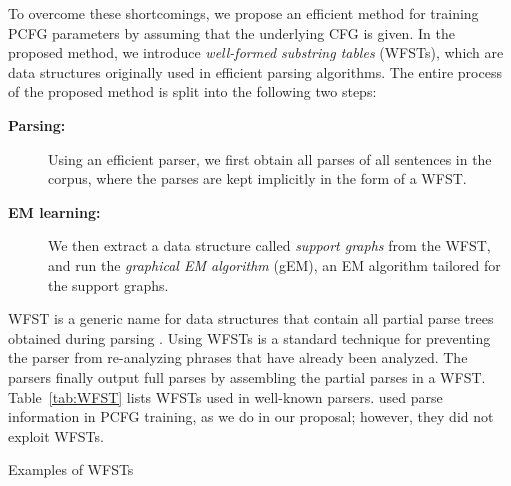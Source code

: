 \documentclass[english]{jnlp_1.4_rep}
\begin{document}
To overcome these shortcomings, we propose an efficient method for training
PCFG parameters by assuming that the underlying CFG is given.
In the proposed method, we introduce {\em well-formed substring tables}
(WFSTs), which are data structures originally used in efficient parsing algorithms.
The entire process of the proposed method is split into the following
two steps:
\begin{description}
\item[\textbf{Parsing:}]
  Using an efficient parser, we first obtain all parses of all sentences
  in the corpus, where the parses are kept implicitly in the form of a WFST.
\item[\textbf{EM learning:}]
  We then extract a data structure called {\em support graphs} from the
  WFST, and run the {\em graphical EM algorithm} (gEM), an EM algorithm
  tailored for the support graphs.
\end{description}
WFST is a generic name for data structures that contain all
partial parse trees obtained during parsing \cite{Tanaka88,Nagata99}.
Using WFSTs is a standard technique for preventing the parser
from re-analyzing phrases that have already been analyzed.
The parsers finally output full parses by assembling the partial
parses in a WFST.  Table~\ref{tab:WFST} lists WFSTs used in
well-known parsers.   used parse information
in PCFG training, as we do in our proposal; however,
they did not exploit WFSTs.

\begin{table}[b]
\caption{Examples of WFSTs}
\label{tab:WFST}

\end{table}
\end{document}
